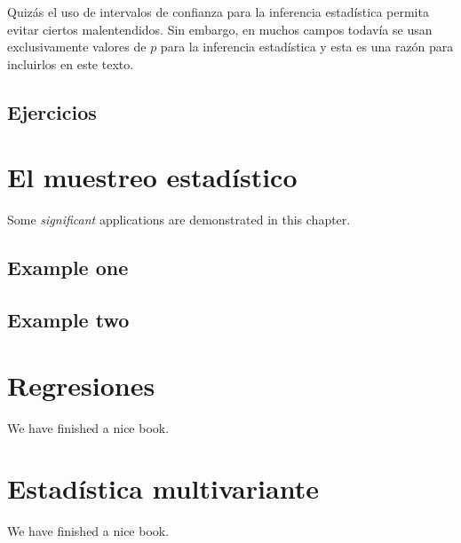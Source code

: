 \documentclass[
]{book}
\begin{document}
Quizás el uso de intervalos de confianza para la inferencia estadística permita evitar ciertos malentendidos. Sin embargo, en muchos campos todavía se usan exclusivamente valores de \(p\) para la inferencia estadística y esta es una razón para incluirlos en este texto.

\hypertarget{ejercicios-2}{%
\section{Ejercicios}\label{ejercicios-2}}

\hypertarget{el-muestreo-estaduxedstico}{%
\chapter{El muestreo estadístico}\label{el-muestreo-estaduxedstico}}

Some \emph{significant} applications are demonstrated in this chapter.

\hypertarget{example-one}{%
\section{Example one}\label{example-one}}

\hypertarget{example-two}{%
\section{Example two}\label{example-two}}

\hypertarget{regresiones}{%
\chapter{Regresiones}\label{regresiones}}

We have finished a nice book.

\hypertarget{estaduxedstica-multivariante}{%
\chapter{Estadística multivariante}\label{estaduxedstica-multivariante}}

We have finished a nice book.

  
\end{document}
